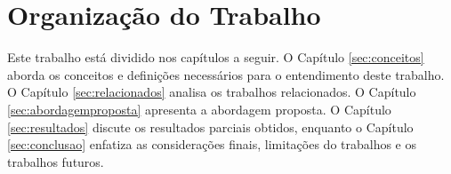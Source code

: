 \section{Organização do Trabalho}
Este trabalho está dividido nos capítulos a seguir. O Capítulo \ref{sec:conceitos} aborda os conceitos e definições necessários para o entendimento deste trabalho. O Capítulo \ref{sec:relacionados} analisa os trabalhos relacionados. O Capítulo \ref{sec:abordagemproposta} apresenta a abordagem proposta. O Capítulo \ref{sec:resultados} discute os resultados parciais obtidos, enquanto o Capítulo \ref{sec:conclusao} enfatiza as considerações finais, limitações do trabalhos e os trabalhos futuros.